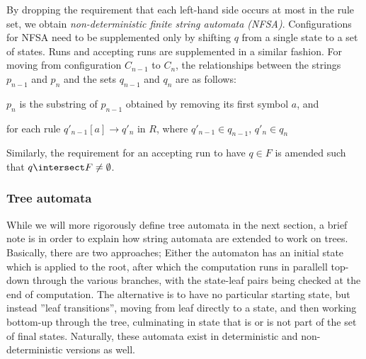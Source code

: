 By dropping the requirement that each left-hand side occurs at most in the
rule set, we obtain \emph{non-deterministic finite string automata (NFSA)}.
Configurations for NFSA need to be supplemented only by shifting $q$ from a
single state to a set of states. Runs and accepting runs are supplemented
in a similar fashion. For moving from configuration $C_{n-1}$ to $C_n$, the
relationships between the strings $p_{n-1}$ and $p_n$ and the sets
$q_{n-1}$ and $q_n$ are as follows:
\begin{compactitem}
\item $p_n$ is the substring of $p_{n-1}$ obtained by removing its first symbol
$a$, and
\item for each rule 
$q'_{n-1}[a] \rightarrow q'_n$
in $R$, where $q'_{n-1} \in q_{n-1}$, $q'_n \in q_n$
\end{compactitem}
Similarly, the requirement for an accepting run to have $q \in F$ is
amended such that $q \intersect F \neq \emptyset$.

\subsubsection{Tree automata}

While we will more rigorously define tree automata in the next section, a
brief note is in order to explain how string automata are extended to work
on trees. Basically, there are two approaches; Either the automaton has an
initial state which is applied to the root, after which the computation
runs in parallell top-down through the various branches, with the
state-leaf pairs being checked at the end of computation. The alternative
is to have no particular starting state, but instead ''leaf transitions'',
moving from leaf directly to a state, and then working bottom-up through
the tree, culminating in state that is or is not part of the set of final
states. Naturally, these automata exist in deterministic and
non-deterministic versions as well. 

